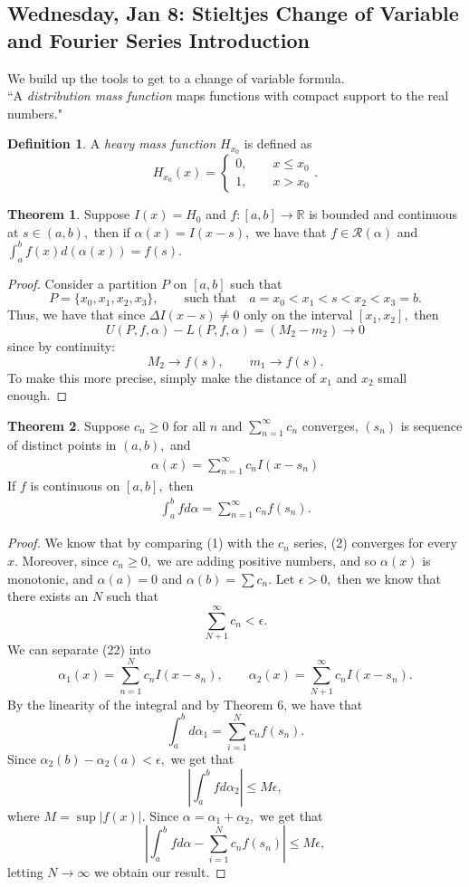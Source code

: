 \documentclass[10pt, oneside]{article}
\newcommand{\bbR}{\mathbb{R}}
\theoremstyle{definition}
\newtheorem{thm}{Theorem}
\newtheorem{defn}{Definition}
\begin{document}
\subsection{Wednesday, Jan 8: Stieltjes Change of Variable and Fourier Series Introduction}
We build up the tools to get to a change of variable formula.\\
``A \textit{distribution mass function} maps functions with compact support to the real numbers."
\begin{defn}
    A \textit{heavy mass function} $H_{x_0}$ is defined as
    \[H_{x_0}(x) = \begin{cases}
        0, \qquad x \leq x_0\\
        1, \qquad x>x_0
    \end{cases}.\]
\end{defn}
\begin{thm}
    Suppose $I(x) = H_0$ and $f: [a,b]\to \bbR$ is bounded and continuous at $s\in (a,b),$ then if $\alpha(x) = I(x-s),$ we have that $f\in \mathcal{R}(\alpha)$ and $\int_a^bf(x)d(\alpha(x)) = f(s).$
\end{thm}
\begin{proof}
    Consider a partition $P$ on $[a,b]$ such that 
    \[P = \{x_0, x_1, x_2, x_3\}, \qquad \text{such that} \quad a = x_0 < x_1 < s < x_2 < x_3 = b.\] Thus, we have that since $\Delta I(x-s) \neq 0$ only on the interval $[x_1, x_2],$ then 
    \[U(P,f,\alpha) - L(P, f, \alpha) = (M_2 - m_2)\to 0\] since by continuity:
    \[M_2 \to f(s), \qquad m_1 \to f(s).\] To make this more precise, simply make the distance of $x_1$ and $x_2$ small enough.
\end{proof}
\begin{thm}
    Suppose $c_n \geq 0$ for all $n$ and $\sum_{n=1}^\infty c_n$ converges, $(s_n)$ is sequence of distinct points in $(a,b),$ and 
    \begin{align}
    \alpha(x) = \sum_{n=1}^\infty c_n I(x-s_n)    
    \end{align}
     If $f$ is continuous on $[a,b],$ then 
    \begin{align}
\int_a^b fd\alpha = \sum_{n=1}^\infty c_n f(s_n).        
    \end{align}
\end{thm}
\begin{proof}
    We know that by comparing (1) with the $c_n$ series, (2) converges for every $x.$ Moreover, since $c_n \geq 0,$ we are adding positive numbers, and so $\alpha(x)$ is monotonic, and $\alpha(a) = 0$ and $\alpha(b) = \sum c_n$. Let $\epsilon>0,$ then we know that there exists an $N$ such that 
    \[\sum_{N+1}^\infty c_n < \epsilon.\] We can separate (22) into
    \[\alpha_1(x) = \sum_{n=1}^N c_n I(x-s_n), \qquad \alpha_2(x) = \sum_{N+1}^\infty c_n I(x-s_n).\] By the linearity of the integral and by Theorem 6, we have that 
    \[\int_a^b d\alpha_1 = \sum_{i=1}^N c_n f(s_n).\] Since $\alpha_2(b) - \alpha_2(a)<\epsilon,$ we get that
    \[\left|\int_a^b f d\alpha_2\right| \leq M\epsilon,\] where $M = \sup |f(x)|.$ Since $\alpha = \alpha_1 + \alpha_2,$ we get that 
    \[\left|\int_a^b fd\alpha - \sum_{i=1}^N c_n f(s_n)\right|\leq M\epsilon,\] letting $N\to \infty$ we obtain our result.
\end{proof}
\end{document}
